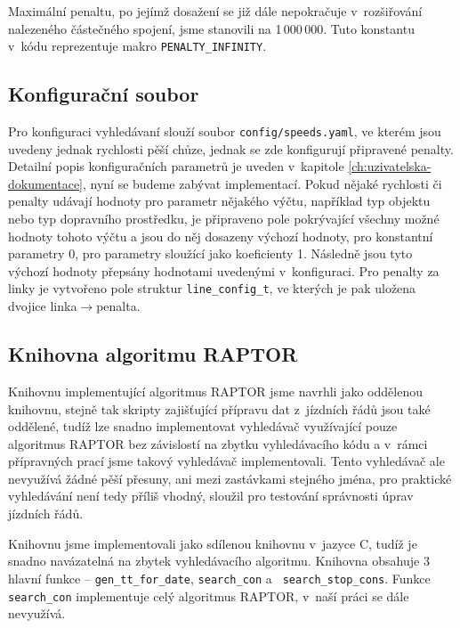 Maximální penaltu, po jejímž dosažení se již dále nepokračuje v~rozšiřování
nalezeného částečného spojení, jsme stanovili na 1\,000\,000. Tuto konstantu
v~kódu reprezentuje makro {\tt PENALTY\_INFINITY}.

\subsection{Konfigurační soubor}
Pro konfiguraci vyhledávaní slouží soubor {\tt config/speeds.yaml}, ve kterém
jsou uvedeny jednak rychlosti pěší chůze, jednak se zde konfigurují připravené
penalty. Detailní popis konfiguračních parametrů je uveden v~kapitole
\ref{ch:uzivatelska-dokumentace}, nyní se budeme zabývat implementací. Pokud
nějaké rychlosti či penalty udávají hodnoty pro parametr nějakého výčtu,
například typ objektu nebo typ dopravního prostředku, je připraveno pole
pokrývající všechny možné hodnoty tohoto výčtu a jsou do něj dosazeny výchozí
hodnoty, pro konstantní parametry 0, pro parametry sloužící jako koeficienty 1.
Následně jsou tyto výchozí hodnoty přepsány hodnotami uvedenými v~konfiguraci.
Pro penalty za linky je vytvořeno pole struktur {\tt line\_config\_t}, ve
kterých je pak uložena dvojice linka$\rightarrow$penalta. 

\subsection{Knihovna algoritmu RAPTOR}
Knihovnu implementující algoritmus RAPTOR jsme navrhli jako oddělenou knihovnu,
stejně tak skripty zajišťující přípravu dat z~jízdních řádů jsou také oddělené,
tudíž lze snadno implementovat vyhledávač využívající pouze algoritmus RAPTOR
bez závislostí na zbytku vyhledávacího kódu a v~rámci přípravných prací jsme
takový vyhledávač implementovali. Tento vyhledávač ale
nevyužívá žádné pěší přesuny, ani mezi zastávkami stejného jména, pro praktické
vyhledávání není tedy příliš vhodný, sloužil pro testování správnosti úprav
jízdních řádů.

Knihovnu jsme implementovali jako sdílenou knihovnu v~jazyce C, tudíž je snadno
navázatelná na zbytek vyhledávacího algoritmu. Knihovna obsahuje 3 hlavní
funkce -- {\tt gen\_tt\_for\_date}, {\tt search\_con} a {\tt
search\_stop\_cons}. Funkce {\tt search\_con} implementuje celý algoritmus
RAPTOR, v~naší práci se dále nevyužívá.

